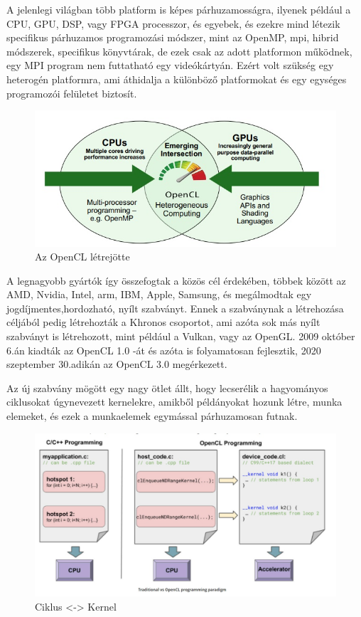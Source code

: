 

A jelenlegi világban több platform is képes párhuzamosságra, ilyenek például a CPU, GPU, DSP, vagy FPGA processzor, és egyebek, és ezekre mind létezik specifikus párhuzamos programozási módszer, mint az OpenMP, mpi, hibrid módszerek, specifikus könyvtárak, de ezek csak az adott platformon működnek, egy MPI program nem futtatható egy videókártyán. Ezért volt szükség egy heterogén platformra, ami áthidalja a különböző platformokat és egy egységes programozói felületet biztosít. 

\begin{figure}[h]
\centering
\includegraphics[scale=0.7]{images/opencl_origin.jpg}
\caption{Az OpenCL létrejötte}
\label{fig:m2sv}
\end{figure}

A legnagyobb gyártók így összefogtak a közös cél érdekében, többek között az AMD, Nvidia, Intel, arm, IBM, Apple, Samsung, és megálmodtak egy jogdíjmentes,hordozható, nyílt szabványt. Ennek a szabványnak a létrehozása céljából pedig létrehozták a Khronos csoportot, ami azóta sok más nyílt szabványt is létrehozott, mint például a Vulkan, vagy az OpenGL. 2009 október 6.án kiadták az OpenCL 1.0 -át és azóta is folyamatosan fejlesztik, 2020 szeptember 30.adikán az OpenCL 3.0 megérkezett.

Az új szabvány mögött egy nagy ötlet állt, hogy lecserélik a hagyományos ciklusokat úgynevezett kernelekre, amikből példányokat hozunk létre, munka elemeket, és ezek a munkaelemek egymással párhuzamosan futnak.

\begin{figure}[h]
\centering
\includegraphics[scale=0.4]{images/loopvskernel.jpg}
\caption{Ciklus <-> Kernel}
\label{fig:loopVsKernel}
\end{figure}


